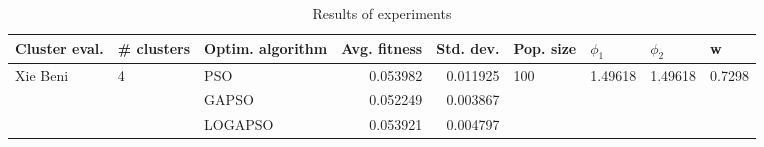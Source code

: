\begin{table}
\centering
\caption{Results of experiments}
\begin{tabular}{lllrrllll}
\toprule
            Cluster eval. &        \# clusters & Optim. algorithm &  Avg. fitness &  Std. dev. &            Pop. size &               $\phi_{1}$ &               $\phi_{2}$ &                       w \\
\midrule
\multirow{3}{*}{Xie Beni} & \multirow{3}{*}{4} &              PSO &      0.053982 &   0.011925 & \multirow{3}{*}{100} & \multirow{3}{*}{1.49618} & \multirow{3}{*}{1.49618} & \multirow{3}{*}{0.7298} \\
                          &                    &            GAPSO &      0.052249 &   0.003867 &                      &                          &                          &                         \\
                          &                    &          LOGAPSO &      0.053921 &   0.004797 &                      &                          &                          &                         \\
\bottomrule
\end{tabular}
\end{table}
